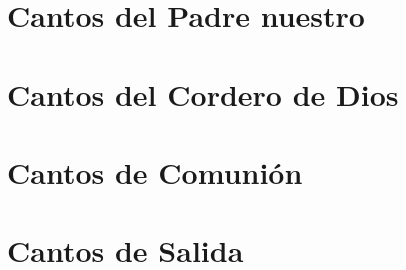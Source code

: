 \documentclass[12pt,letterpaper,twoside]{article}
\begin{document}
\hypertarget{padrenuestro}{}
\section{Cantos del Padre nuestro}
\pagebreak

\hypertarget{cordero}{}
\section{Cantos del Cordero de Dios}
\pagebreak

\section{Cantos de Comunión}
\pagebreak
\pagebreak
\pagebreak
\pagebreak
\pagebreak

\hypertarget{salida}{}
\section{Cantos de Salida}
\pagebreak
\pagebreak
\pagebreak
\pagebreak
\end{document}
